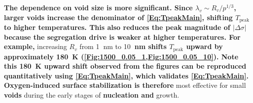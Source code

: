 \documentclass[preprint,12pt,sort&compress]{elsarticle}
\newcommand{\?}{\stackrel{?}{=}}
\providecommand{\DIFaddtex}[1]{{\bf #1}} %
\providecommand{\DIFdeltex}[1]{} %
\providecommand{\DIFaddbegin}{\protect\color{blue}} %
\providecommand{\DIFaddend}{\protect\color{black}} %
\providecommand{\DIFdelbegin}{\protect\color{red}} %
\providecommand{\DIFdelend}{\protect\color{black}} %
\providecommand{\DIFadd}[1]{\texorpdfstring{\DIFaddtex{#1}}{#1}} %
\providecommand{\DIFdel}[1]{\texorpdfstring{\DIFdeltex{#1}}{}} %
\newcommand{\DIFscaledelfig}{0.5}
\newlength{\DIFdelgraphicswidth} %
\newlength{\DIFdelgraphicsheight} %
\newcommand{\DIFaddincludegraphics}[2][]{{\color{blue}\fbox{\DIFOincludegraphics[#1]{#2}}}} %
\newcommand{\DIFdelincludegraphics}[2][]{%
\sbox{\DIFdelgraphicsbox}{\DIFOincludegraphics[#1]{#2}}%
\settoboxwidth{\DIFdelgraphicswidth}{\DIFdelgraphicsbox} %
\settoboxtotalheight{\DIFdelgraphicsheight}{\DIFdelgraphicsbox} %
\scalebox{\DIFscaledelfig}{%
\parbox[b]{\DIFdelgraphicswidth}{\usebox{\DIFdelgraphicsbox}\\[-\baselineskip] \rule{\DIFdelgraphicswidth}{0em}}\llap{\resizebox{\DIFdelgraphicswidth}{\DIFdelgraphicsheight}{%
\setlength{\unitlength}{\DIFdelgraphicswidth}%
\begin{picture}(1,1)%
\thicklines\linethickness{2pt} %
{\color[rgb]{1,0,0}\put(0,0){\framebox(1,1){}}}%
{\color[rgb]{1,0,0}\put(0,0){\line( 1,1){1}}}%
{\color[rgb]{1,0,0}\put(0,1){\line(1,-1){1}}}%
\end{picture}%
}\hspace*{3pt}}} %
} %
\DeclareRobustCommand{\DIFaddbegin}{\DIFOaddbegin \let\includegraphics\DIFaddincludegraphics} %
\DeclareRobustCommand{\DIFaddend}{\DIFOaddend \let\includegraphics\DIFOincludegraphics} %
\DeclareRobustCommand{\DIFdelbegin}{\DIFOdelbegin \let\includegraphics\DIFdelincludegraphics} %
\DeclareRobustCommand{\DIFdelend}{\DIFOaddend \let\includegraphics\DIFOincludegraphics} %
\begin{document}
\DIFadd{The dependence on void size is more significant. Since $\lambda_v \sim R_v / p^{1/3}$, larger voids increase the denominator of \cref{Eq:TpeakMain}, shifting $T_\text{peak}$ to higher temperatures. This also reduces the peak magnitude of $|\Delta\sigma|$ because the segregation drive is weaker at higher temperatures. For example, }\DIFaddend increasing $R_v$ from 1\DIFaddbegin \DIFadd{~}\DIFaddend nm to 10\DIFdelbegin \DIFdel{nm shifts the temperature of maximum surface energy reduction by about 200 K to the right, and slightly decreases the overall magnitude of $\Delta \sigma$. This indicates that larger voids require higher temperatures for oxygen adsorption to meaningfully lower their surface energy. Nevertheless, even at elevated temperatures, the reduction in surface energy for larger voids remains smaller than that for smaller voids at the same porosity and oxygen concentration. Thus, oxygen-induced surface stabilization is }\DIFdelend \DIFaddbegin \DIFadd{~nm shifts $T_\text{peak}$ upward by approximately 180~K (\cref{Fig:1500_0.05_1,Fig:1500_0.05_10}). Note this 180~K upward shift observed from the figures can be reproduced quantitatively using \cref{Eq:TpeakMain}, which validates \cref{Eq:TpeakMain}. Oxygen-induced surface stabilization is therefore }\DIFaddend most effective for small \DIFdelbegin \DIFdel{cavities, i.e., }\DIFdelend \DIFaddbegin \DIFadd{voids }\DIFaddend during the early stages of \DIFdelbegin \DIFdel{void nucleation and bubble }\DIFdelend \DIFaddbegin \DIFadd{nucleation and }\DIFaddend growth.

\end{document}
